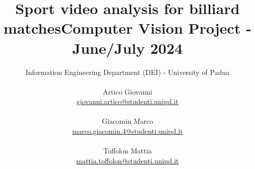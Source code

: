 \documentclass{article}
\title{\huge\textbf{Sport video analysis for billiard matches}\newline\Large Computer Vision Project - June/July 2024
}
\author{Information Engineering Department (DEI) - University of Padua \\ \\
        Artico Giovanni \\ \href{mailto:giovanni.artico@studenti.unipd.it}{giovanni.artico@studenti.unipd.it} \\ \\
        Giacomin Marco \\  \href{mailto:marco.giacomin.4@studenti.unipd.it}{marco.giacomin.4@studenti.unipd.it} \\ \\
        Toffolon Mattia \\ \href{mailto:mattia.toffolon@studenti.unipd.it}{mattia.toffolon@studenti.unipd.it} 
}
\date{}
\begin{document}
\maketitle
\vspace{10mm}
\tableofcontents
\thispagestyle{empty}

\newpage
{}















\label{sec:performance}











\end{document}
